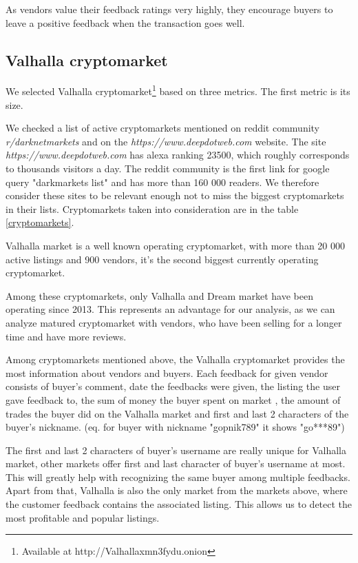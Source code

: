 \documentclass[
  digital, %
  table,   %
  lof,     %
  lot,     %
  oneside
]{fithesis3}
\begin{document}
As vendors value their feedback ratings very highly, they encourage buyers to leave a positive feedback when the transaction goes well.
 
\subsection{Valhalla cryptomarket}

We selected Valhalla cryptomarket\footnote{Available at http://Valhallaxmn3fydu.onion} based on three metrics.
The first metric is its size.

We checked a list of active cryptomarkets mentioned on reddit community \emph{r/darknetmarkets} and on the 
\emph{https://www.deepdotweb.com} website.
The site \emph{https://www.deepdotweb.com} has alexa ranking 23500, which roughly corresponds to thousands visitors a day.
The reddit community is the first link for google query "darkmarkets list" and 
has more than 160 000 readers. We therefore consider these sites to be relevant enough not to miss
the biggest cryptomarkets in their lists. Cryptomarkets taken into consideration are in the table \ref{cryptomarkets}.

Valhalla market is a well known operating cryptomarket, with more than 20 000 active listings and 900 vendors, it's the second biggest currently operating cryptomarket.

Among these cryptomarkets, only Valhalla and Dream market have been operating since 2013.
This represents an advantage for our analysis, as we can analyze matured cryptomarket with vendors,
who have been selling for a longer time and have more reviews.

Among cryptomarkets mentioned above,
the Valhalla cryptomarket provides the most information about vendors and buyers.
Each feedback for given vendor consists of 
buyer's comment, date the feedbacks were given, the listing the user gave feedback to, the sum of money the buyer spent on market
, the amount of trades the buyer did on the Valhalla market and
first and last 2 characters of the buyer's nickname. 
(eq. for buyer with nickname "gopnik789" it shows "go***89")

The first and last 2 characters of buyer's username are really unique for Valhalla market,
other markets offer first and last character of buyer's username at most.
This will greatly help with recognizing the same buyer among multiple feedbacks.
Apart from that, Valhalla is also the only market from the markets above, where the customer feedback contains the
associated listing.
This allows us to detect the most profitable and popular listings.
\end{document}
